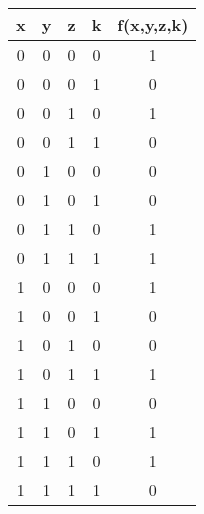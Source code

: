 \documentclass{article}
\begin{document}
\newpage

\begin{center}
  \begin{tabular}{|c|c|c|c|c|}
    \hline
    \textbf{x} & \textbf{y} & \textbf{z} & \textbf{k} & \textbf{f(x,y,z,k)} \\
    \hline
      0 & 0 & 0 & 0 & 1 \\
    \hline
      0 & 0 & 0 & 1 & 0 \\
    \hline
      0 & 0 & 1 & 0 & 1 \\
    \hline
      0 & 0 & 1 & 1 & 0 \\
    \hline
      0 & 1 & 0 & 0 & 0 \\
    \hline
      0 & 1 & 0 & 1 & 0 \\
    \hline
      0 & 1 & 1 & 0 & 1 \\
    \hline
      0 & 1 & 1 & 1 & 1 \\
    \hline
      1 & 0 & 0 & 0 & 1 \\
    \hline
      1 & 0 & 0 & 1 & 0 \\
    \hline
      1 & 0 & 1 & 0 & 0 \\
    \hline
      1 & 0 & 1 & 1 & 1 \\
    \hline
      1 & 1 & 0 & 0 & 0 \\
    \hline
      1 & 1 & 0 & 1 & 1 \\
    \hline
      1 & 1 & 1 & 0 & 1 \\
    \hline
      1 & 1 & 1 & 1 & 0 \\
    \hline
  \end{tabular}
\end{center}
\end{document}
